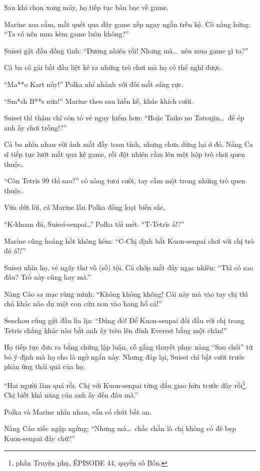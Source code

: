 \documentclass[../main.tex]{subfiles}
\begin{document}
\ct

Sau khi chọn xong máy, họ tiếp tục bàn bạc về game.

Marine xoa cằm, mắt quét qua dãy game xếp ngay ngắn trên kệ. Cô nàng hửng: ``Ta có nên mua kèm game luôn không?''

Suisei gật đầu đồng tình: ``Đương nhiên rồi! Nhưng mà\dots\ nên mua game gì ta?''

Cả ba cô gái bắt đầu liệt kê ra những trò chơi mà họ có thể nghĩ được.

``Ma**o Kart này!'' Polka nhí nhảnh với đôi mắt sáng rực.

``Sm*sh B**s nữa!'' Marine theo sau hiến kế, khúc khích cười.

Suisei thì thậm chí còn tỏ vẻ nguy hiểm hơn: ``Hoặc Taiko no Tatsujin\dots\ để ép anh ấy chơi trống!?''

Cả ba nhìn nhau với ánh mắt đầy toan tính, nhưng chưa dừng lại ở đó. Nàng Ca sĩ tiếp tục lướt mắt qua kệ game, rồi đột nhiên cầm lên một hộp trò chơi quen thuộc.

``Còn Tetris 99 thì sao?'' cô nàng tưoi cười, tay cầm một trong những trò quen thuộc.

Vừa dứt lời, cả Marine lẫn Polka đồng loạt biến sắc.

``K-khoan đã, Suisei-senpai\dots\'' Polka tái mét. ``T-Tetris á!?''

Marine cũng hoảng hốt không kém: ``C-Chị định bắt Kuon-senpai chơi với chị trò đó á!?''

Suisei nhìn họ, vẻ ngây thơ vô (số) tội. Cô chớp mắt đầy ngạc nhiên: ``Thì có sao đâu? Trò này cũng hay mà.''

Nàng Cáo sa mạc rùng mình: ``Không không không! Cái này mà vào tay chị thì chả khác nào dụ một con cừu non vào hang hổ cả!''

Senchou cũng gật đầu lia lịa: ``Đúng đó! Để Kuon-senpai đối đầu với chị trong Tetris chẳng khác nào bắt anh ấy trèo lên đỉnh Everest bằng một chân!''

Họ tiếp tục đưa ra bằng chứng lập luận, cố gắng thuyết phục nàng ``Sao chổi''  từ bỏ ý định mà họ cho là ngớ ngẩn này. Nhưng đáp lại, Suisei chỉ bật cười trước phản ứng thái quá của họ.

``Hai người làm quá rồi. Chị với Kuon-senpai từng đấu giao hữu trước đây rồi\footnote{phần {\abv Truyện phụ}, {\flaregothic ÉPISODE 44}, quyển số Bốn.}. Chị biết khả năng của anh ấy đến đâu mà.''

Polka và Marine nhìn nhau, vẫn có chút bất an.

Nàng Cáo xiếc ngập ngừng; ``Nhưng mà\dots\ chắc chắn là chị không có đè bẹp Kuon-senpai đấy chứ?''
\end{document}
